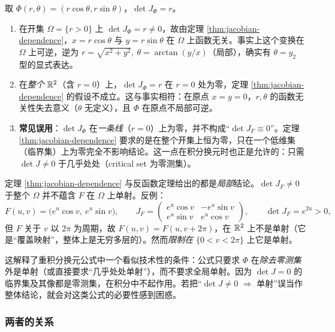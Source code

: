 \begin{example}[极坐标：\(\det J=r\) 与函数无关性]
取 \(\Phi(r,\theta)=(r\cos\theta,r\sin\theta)\)，\(\det J_\Phi=r\)。
\begin{enumerate}[label=(\arabic*)]
  \item 在开集 \(\Omega=\{r>0\}\) 上 \(\det J_\Phi=r\ne0\)，故由定理 \ref{thm:jacobian-dependence}，\(x=r\cos\theta\) 与 \(y=r\sin\theta\) 在 \(\Omega\) 上函数无关。事实上这个变换在 \(\Omega\) 上可逆，逆为 \(r=\sqrt{x^2+y^2},\ \theta=\arctan(y/x)\)（局部），确实有 \(\theta=y_2\) 型的显式表达。
  \item 在\emph{整个} \(\mathbb{R}^2\)（含 \(r=0\)）上，\(\det J_\Phi=r\) 在 \(r=0\) 处为零，定理 \ref{thm:jacobian-dependence} 的假设不成立。这与事实相符：在原点 \(x=y=0\)，\(r,\theta\) 的函数无关性失去意义（\(\theta\) 无定义），且 \(\Phi\) 在原点不局部可逆。
  \item \textbf{常见误用}：\(\det J_\Phi\) 在\emph{一条线}（\(r=0\)）上为零，并不构成“\(\det J_F\equiv0\)”。定理 \ref{thm:jacobian-dependence} 要求的是在整个开集上恒为零，只在一个低维集（临界集）上为零完全不影响结论。这一点在积分换元时也正是允许的：只需 \(\det J\ne0\) 于几乎处处（critical set 为零测集）。
\end{enumerate}
\end{example}

\begin{remark}
定理 \ref{thm:jacobian-dependence} 与反函数定理给出的都是\emph{局部}结论。\(\det J_F\ne0\) 于整个 \(\Omega\) 并不蕴含 \(F\) 在 \(\Omega\) 上单射。反例：
\[
F(u,v)=\bigl(e^{u}\cos v,\ e^{u}\sin v\bigr),\qquad
J_F=\begin{pmatrix}e^u\cos v & -e^u\sin v\\ e^u\sin v & e^u\cos v\end{pmatrix},
\qquad
\det J_F=e^{2u}>0 ,
\]
但 \(F\) 关于 \(v\) 以 \(2\pi\) 为周期，故 \(F(u,v)=F(u,v+2\pi)\)，在 \(\mathbb{R}^2\) 上不是单射（它是“覆盖映射”，整体上是无穷多层的）。然而\emph{限制在} \(\{0<v<2\pi\}\) 上它是单射。

这解释了重积分换元公式中一个看似技术性的条件：公式只要求 \(\Phi\) 在\emph{除去零测集}外是单射（或直接要求“几乎处处单射”），而不要求全局单射。因为 \(\det J=0\) 的临界集及其像都是零测集，在积分中不起作用。若把“\(\det J\ne0\) \(\Rightarrow\) 单射”误当作整体结论，就会对这类公式的必要性感到困惑。
\end{remark}

\subsubsection{两者的关系}

